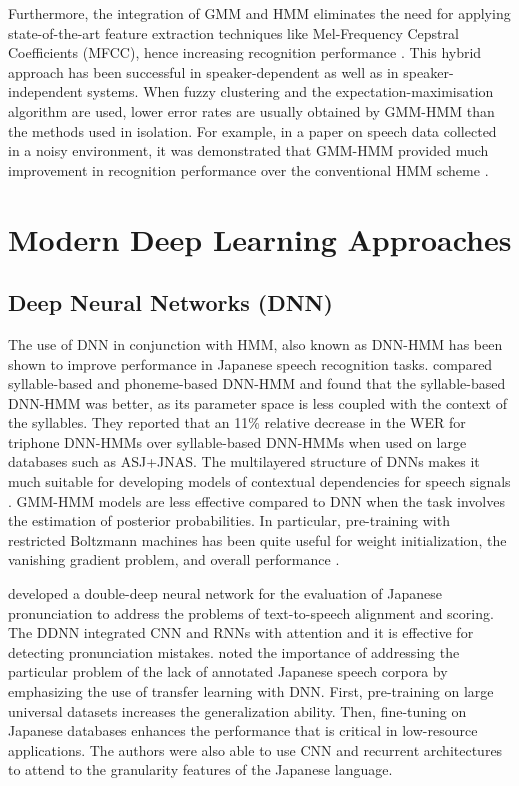 Furthermore, the integration of GMM and HMM eliminates the need for applying state-of-the-art feature extraction techniques like Mel-Frequency Cepstral Coefficients (MFCC), hence increasing recognition performance \parencite{nicita1}. This hybrid approach has been successful in speaker-dependent as well as in speaker-independent systems. When fuzzy clustering and the expectation-maximisation algorithm are used, lower error rates are usually obtained by GMM-HMM than the methods used in isolation. For example, in a paper on speech data collected in a noisy environment, it was demonstrated that GMM-HMM provided much improvement in recognition performance over the conventional HMM scheme \parencite{taheri2006fuzzy, nicita1}.


\section{Modern Deep Learning Approaches}
\subsection{Deep Neural Networks (DNN)}
The use of DNN in conjunction with HMM, also known as DNN-HMM has been shown to improve performance in Japanese speech recognition tasks. \textcite{seki2014comparison} compared syllable-based and phoneme-based DNN-HMM and found that the syllable-based DNN-HMM was better, as its parameter space is less coupled with the context of the syllables. They reported that an 11\% relative decrease in the WER for triphone DNN-HMMs over syllable-based DNN-HMMs when used on large databases such as ASJ+JNAS. The multilayered structure of DNNs makes it much suitable for developing models of contextual dependencies for speech signals \parencite{hojo2018dnn}. GMM-HMM models are less effective compared to DNN when the task involves the estimation of posterior probabilities. In particular, pre-training with restricted Boltzmann machines has been quite useful for weight initialization, the vanishing gradient problem, and overall performance \parencite{Mimura2013CSJ}.

\textcite{mu2020japanese} developed a double-deep neural network for the evaluation of Japanese pronunciation to address the problems of text-to-speech alignment and scoring. The DDNN integrated CNN and RNNs with attention and it is effective for detecting pronunciation mistakes. \textcite{lin2017dnn} noted the importance of addressing the particular problem of the lack of annotated Japanese speech corpora by emphasizing the use of transfer learning with DNN. First, pre-training on large universal datasets increases the generalization ability. Then, fine-tuning on Japanese databases enhances the performance that is critical in low-resource applications. The authors were also able to use CNN and recurrent architectures to attend to the granularity features of the Japanese language.

